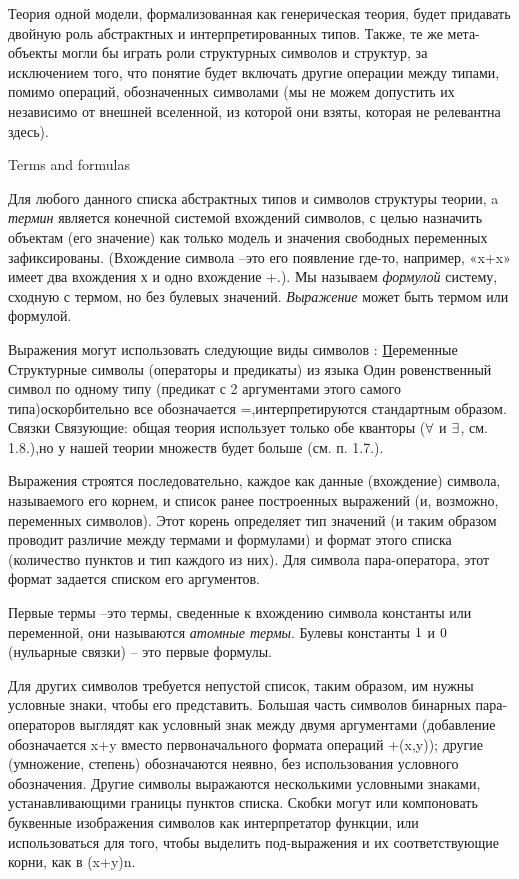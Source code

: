 Теория одной модели, формализованная как генерическая теория, будет придавать   двойную роль абстрактных и интерпретированных типов.  Также, те же мета-объекты могли бы играть роли структурных символов и структур, за исключением того, что понятие  будет включать другие операции между типами, помимо операций, обозначенных символами (мы не можем допустить их  независимо от внешней вселенной, из которой они взяты, которая не релевантна здесь).

{\sst Terms and formulas}


Для любого данного списка абстрактных типов и символов структуры теории, a {\it термин} является конечной системой вхождений символов, с целью назначить объектам (его значение) как только модель и значения свободных переменных зафиксированы. (Вхождение символа –это его появление где-то, например, «x+x» имеет два вхождения х и одно вхождение +.). Мы называем {\it формулой} систему, сходную с термом, но без булевых значений. {\it Выражение} может быть термом или формулой. 


Выражения могут использовать следующие виды символов :
\ul Переменные
\li Структурные символы (операторы и предикаты) из языка
\li Один ровенственный символ по одному типу (предикат с 2 аргументами этого самого типа)оскорбительно все обозначается =,интерпретируются стандартным образом.
\li Связки
\li Связующие: общая теория использует только обе кванторы ($\forall$ и $\exists$, см. 1.8.),но у нашей теории множеств будет больше (см. п. 1.7.).
\lu

Выражения строятся последовательно, каждое как данные (вхождение) символа, называемого его корнем, и список ранее построенных выражений (и, возможно, переменных символов). Этот корень определяет тип значений (и таким образом проводит различие между термами и формулами) и формат этого списка (количество пунктов и тип каждого из них). Для символа пара-оператора, этот формат задается списком его аргументов. 

Первые термы –это термы, сведенные к вхождению символа константы или переменной, они называются {\it атомные термы}. Булевы константы $1$ и $0$ (нульарные связки) – это первые формулы.

Для других символов требуется непустой список, таким образом, им нужны условные знаки, чтобы его представить. Большая часть символов бинарных пара-операторов выглядят как условный знак между двумя аргументами (добавление обозначается x+y вместо первоначального формата операций  +(x,y)); другие (умножение, степень) обозначаются неявно, без использования условного обозначения. 
Другие символы выражаются несколькими условными знаками, устанавливающими границы пунктов списка. Скобки могут или компоновать буквенные изображения символов как интерпретатор функции, или использоваться для того, чтобы выделить под-выражения и их соответствующие корни, как в (x+y)n.

